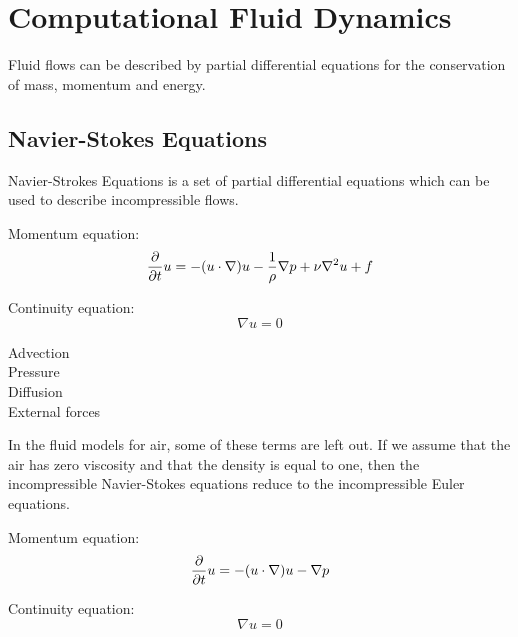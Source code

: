 \section{Computational Fluid Dynamics}

Fluid flows can be described by partial differential equations for the conservation 
of mass, momentum and energy. 

\subsection{Navier-Stokes Equations}

Navier-Strokes Equations is a set of partial differential equations which can be
used to describe incompressible flows\cite{fluidDynamicsIntro}. 

Momentum equation: 
$$\frac{\partial}{\partial t}u  = -(u \cdot \nabla)u - \frac{1}{\rho}\nabla p + \nu \nabla^2 u + f$$

Continuity equation:
$$\nabla u = 0$$

\begin{description}
	\item[Advection]
	\item[Pressure]
	\item[Diffusion]
	\item[External forces]
\end{description}


In the fluid models for air, some of these terms are left out. If we assume that 
the air has zero viscosity and that the density is equal to one, then the 
incompressible Navier-Stokes equations reduce to the incompressible Euler 
equations. 

Momentum equation: 
$$\frac{\partial}{\partial t}u  = -(u \cdot \nabla)u - \nabla p$$

Continuity equation:
$$\nabla u = 0$$
